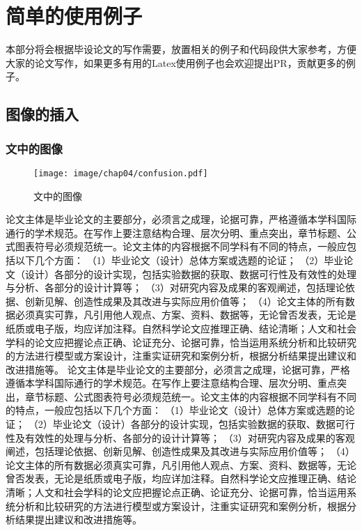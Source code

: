 \chapter{简单的使用例子}
\label{cha:usage-example}

本部分将会根据毕设论文的写作需要，放置相关的例子和代码段供大家参考，方便大家的论文写作，如果更多有用的Latex使用例子也会欢迎提出PR，贡献更多的例子。

\section{图像的插入}

\subsection{文中的图像}
\begin{figure}
    \centering
    \texttt{[image: image/chap04/confusion.pdf]}
    \caption{文中的图像}
    \label{fig:image-embedding-text}
\end{figure}
论文主体是毕业论文的主要部分，必须言之成理，论据可靠，严格遵循本学科国际通行的学术规范。在写作上要注意结构合理、层次分明、重点突出，章节标题、公式图表符号必须规范统一。论文主体的内容根据不同学科有不同的特点，一般应包括以下几个方面： （1）毕业论文（设计）总体方案或选题的论证； （2）毕业论文（设计）各部分的设计实现，包括实验数据的获取、数据可行性及有效性的处理与分析、各部分的设计计算等； （3）对研究内容及成果的客观阐述，包括理论依据、创新见解、创造性成果及其改进与实际应用价值等； （4）论文主体的所有数据必须真实可靠，凡引用他人观点、方案、资料、数据等，无论曾否发表，无论是纸质或电子版，均应详加注释。自然科学论文应推理正确、结论清晰；人文和社会学科的论文应把握论点正确、论证充分、论据可靠，恰当运用系统分析和比较研究的方法进行模型或方案设计，注重实证研究和案例分析，根据分析结果提出建议和改进措施等。
论文主体是毕业论文的主要部分，必须言之成理，论据可靠，严格遵循本学科国际通行的学术规范。在写作上要注意结构合理、层次分明、重点突出，章节标题、公式图表符号必须规范统一。论文主体的内容根据不同学科有不同的特点，一般应包括以下几个方面： （1）毕业论文（设计）总体方案或选题的论证； （2）毕业论文（设计）各部分的设计实现，包括实验数据的获取、数据可行性及有效性的处理与分析、各部分的设计计算等； （3）对研究内容及成果的客观阐述，包括理论依据、创新见解、创造性成果及其改进与实际应用价值等； （4）论文主体的所有数据必须真实可靠，凡引用他人观点、方案、资料、数据等，无论曾否发表，无论是纸质或电子版，均应详加注释。自然科学论文应推理正确、结论清晰；人文和社会学科的论文应把握论点正确、论证充分、论据可靠，恰当运用系统分析和比较研究的方法进行模型或方案设计，注重实证研究和案例分析，根据分析结果提出建议和改进措施等。




